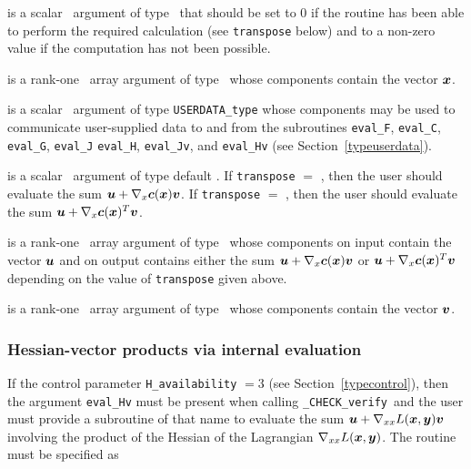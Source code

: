 \documentclass{galahad}
\newcommand{\packagename}{CHECK}
\newcommand{\fullpackagename}{\libraryname\_\packagename}
\newcommand{\solver}{{\tt \fullpackagename\_verify}}
\begin{document}
\begin{description}

 is a scalar \intentout\ argument of type \integer\
that should be set to 0 if the routine has been able to perform the
required calculation (see {\tt transpose} below) and to a non-zero
value if the computation has not been possible.

 is a rank-one \intentin\ array argument of type \realdp\
whose components contain the vector ${\bm{x}}$.

 is a scalar \intentinout\ argument of type 
{\tt USERDATA\_type} whose components may be used
to communicate user-supplied data to and from the
subroutines {\tt eval\_F}, {\tt eval\_C}, {\tt eval\_G}, {\tt eval\_J}
{\tt eval\_H}, {\tt eval\_Jv}, and {\tt eval\_Hv} 
(see Section~\ref{typeuserdata}).

 is a scalar \intentin\ argument of type default
\logical.  If {\tt transpose} $=$ \false, then the user should evaluate the
sum ${\bm{u}} + \nabla_x {\bm{c}}({\bm{x}}) {\bm{v}}$. If {\tt transpose} $=$ \true,
then the user should evaluate the sum ${\bm{u}} + \nabla_x {\bm{c}}({\bm{x}})^T {\bm{v}}$.   

\ittf{U} is a rank-one \intentinout\ array argument of type \realdp\
whose components on input contain the vector ${\bm{u}}$ and on output contains
either the sum ${\bm{u}} + \nabla_x {\bm{c}}({\bm{x}}) {\bm{v}}$ or ${\bm{u}} + \nabla_x {\bm{c}}({\bm{x}})^T
{\bm{v}}$ depending on the value of {\tt transpose} given above.

\ittf{V} is a rank-one \intentin\ array argument of type \realdp\
whose components contain the vector ${\bm{v}}$.

\end{description}


\subsubsection{Hessian-vector products via internal evaluation\label{hvfv}}

If the control parameter {\tt H\_availability} $=3$ (see
Section~\ref{typecontrol}), then the argument {\tt eval\_Hv} must be
present when calling \solver\ and the
user must provide a subroutine of that name to evaluate the
sum ${\bm{u}} + \nabla_{xx} L({\bm{x}},{\bm{y}}) {\bm{v}}$ involving the
product of the Hessian of the Lagrangian $\nabla_{xx} L({\bm{x}},{\bm{y}})$.
The routine must be specified as
\end{document}
